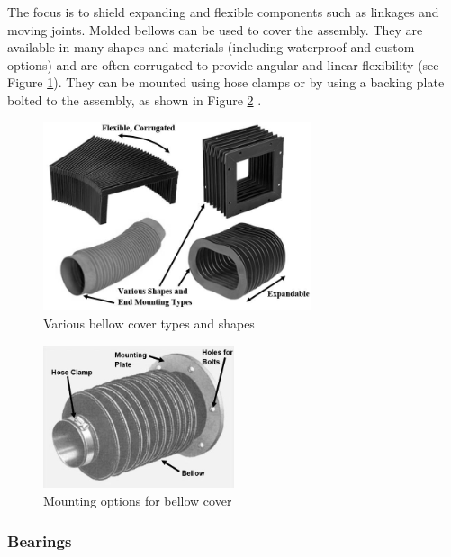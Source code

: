 The focus is to shield expanding and flexible components such as linkages and moving joints. Molded bellows can be used to cover the assembly. They are available in many shapes and materials (including waterproof and custom options) and are often corrugated to provide angular and linear flexibility (see Figure \ref{fig:bellow_types}). They can be mounted using hose clamps or by using a backing plate bolted to the assembly, as shown in Figure \ref{fig:bellow_mount} \cite{hydraulics_&_pneumatics_protect_2012}.

\begin{figure}[H]
    \centering
    \includegraphics[width=0.7\textwidth]{Sections/LiteratureReview/img/seals/bellow_types.JPG}
    \caption{Various bellow cover types and shapes \cite{dynatec_bellows_nodate}}
    \label{fig:bellow_types}
\end{figure}

\begin{figure}[H]
    \centering
    \includegraphics[width=0.5\textwidth]{Sections/LiteratureReview/img/seals/bellow_mount.JPG}
    \caption{Mounting options for bellow cover \cite{hydraulics_&_pneumatics_protect_2012}}
    \label{fig:bellow_mount}
\end{figure}


\subsubsection{Bearings}

